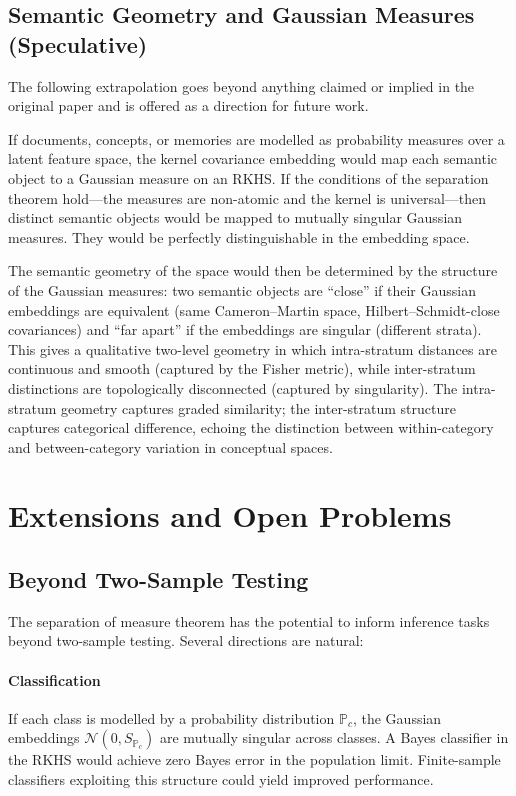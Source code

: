 \documentclass[12pt, oneside]{book}
\theoremstyle{plain}
\theoremstyle{definition}
\newcommand{\calN}{\mathcal{N}}
\newcommand{\PP}{\mathbb{P}}
\begin{document}
\section{Semantic Geometry and Gaussian Measures (Speculative)}

The following extrapolation goes beyond anything claimed or implied in the original paper and is offered as a direction for future work.

If documents, concepts, or memories are modelled as probability measures over a latent feature space, the kernel covariance embedding would map each semantic object to a Gaussian measure on an RKHS. If the conditions of the separation theorem hold---the measures are non-atomic and the kernel is universal---then distinct semantic objects would be mapped to mutually singular Gaussian measures. They would be perfectly distinguishable in the embedding space.

The semantic geometry of the space would then be determined by the structure of the Gaussian measures: two semantic objects are ``close'' if their Gaussian embeddings are equivalent (same Cameron--Martin space, Hilbert--Schmidt-close covariances) and ``far apart'' if the embeddings are singular (different strata). This gives a qualitative two-level geometry in which intra-stratum distances are continuous and smooth (captured by the Fisher metric), while inter-stratum distinctions are topologically disconnected (captured by singularity). The intra-stratum geometry captures graded similarity; the inter-stratum structure captures categorical difference, echoing the distinction between within-category and between-category variation in conceptual spaces.

\chapter{Extensions and Open Problems}
\label{chap:extensions}

\section{Beyond Two-Sample Testing}

The separation of measure theorem has the potential to inform inference tasks beyond two-sample testing. Several directions are natural:

\subsubsection{Classification}
If each class is modelled by a probability distribution $\PP_c$, the Gaussian embeddings $\calN(0, S_{\PP_c})$ are mutually singular across classes. A Bayes classifier in the RKHS would achieve zero Bayes error in the population limit. Finite-sample classifiers exploiting this structure could yield improved performance.
\end{document}
